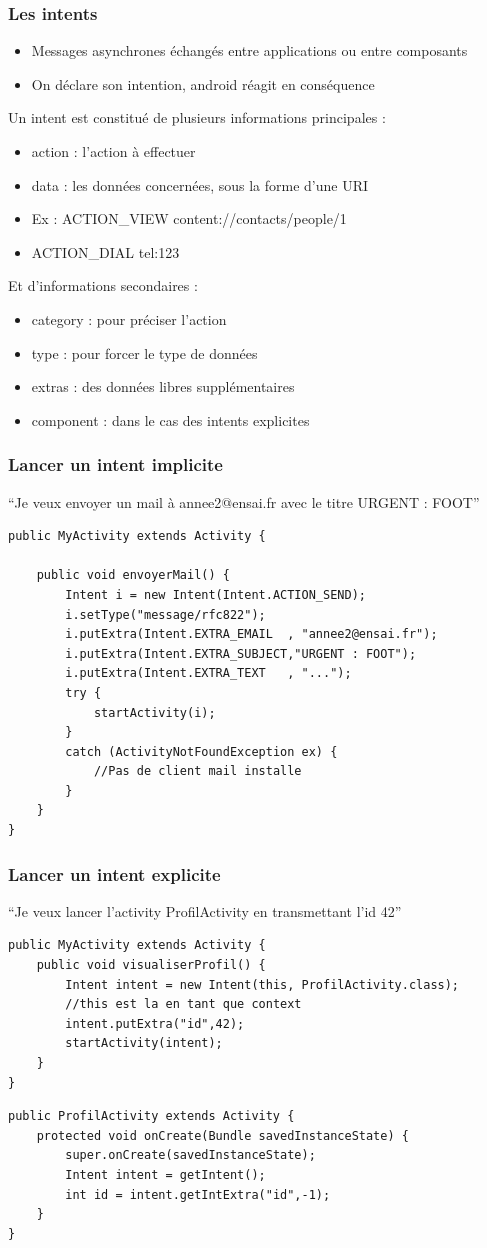 \documentclass{beamer}
\begin{document}
\begin{frame}[fragile]
\frametitle{Les intents}
\begin{itemize}
 \item Messages asynchrones échangés entre applications ou entre composants
 \item On déclare son intention, android réagit en conséquence
 \end{itemize}
Un intent est constitué de plusieurs informations principales :
\begin{itemize}
 \item action : l'action à effectuer 
 \item data : les données concernées, sous la forme d'une URI
 \item Ex : ACTION\_VIEW content://contacts/people/1
 \item ACTION\_DIAL tel:123
 \end{itemize}
Et d'informations secondaires : 
\begin{itemize}
 \item category : pour préciser l'action
 \item type : pour forcer le type de données 
 \item extras : des données libres supplémentaires
 \item component : dans le cas des intents explicites
 \end{itemize}
\end{frame}
\begin{frame}[fragile]
\frametitle{Lancer un intent implicite}
``Je veux envoyer un mail à annee2@ensai.fr avec le titre URGENT : FOOT''
\begin{lstlisting}
public MyActivity extends Activity {
    
    public void envoyerMail() {
        Intent i = new Intent(Intent.ACTION_SEND);
        i.setType("message/rfc822");
        i.putExtra(Intent.EXTRA_EMAIL  , "annee2@ensai.fr");
        i.putExtra(Intent.EXTRA_SUBJECT,"URGENT : FOOT"); 
        i.putExtra(Intent.EXTRA_TEXT   , "...");
        try {
            startActivity(i);
        } 
        catch (ActivityNotFoundException ex) {
            //Pas de client mail installe
        }
    }	
}
\end{lstlisting}
\end{frame}
\begin{frame}[fragile]
\frametitle{Lancer un intent explicite}
``Je veux lancer l'activity ProfilActivity en transmettant l'id 42''
\begin{lstlisting}
public MyActivity extends Activity {
    public void visualiserProfil() {
        Intent intent = new Intent(this, ProfilActivity.class); 
        //this est la en tant que context
        intent.putExtra("id",42);
        startActivity(intent);
    }	
}
\end{lstlisting}

\begin{lstlisting}
public ProfilActivity extends Activity {
    protected void onCreate(Bundle savedInstanceState) {
        super.onCreate(savedInstanceState);
        Intent intent = getIntent();
        int id = intent.getIntExtra("id",-1);
    }
}
\end{lstlisting}
\end{frame}
\end{document}
